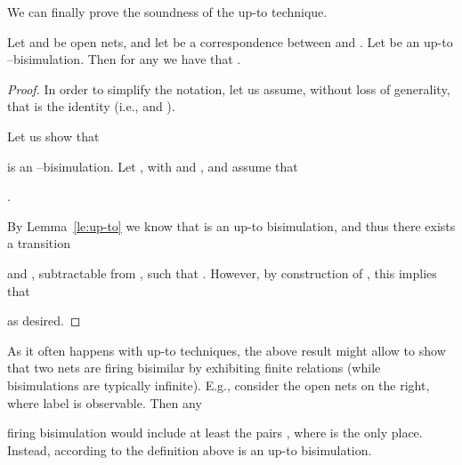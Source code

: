 \documentclass{LMCS}
\begin{document}
We can finally prove the soundness of the up-to technique.

\begin{prop}
  \label{pr:upto}
  Let  and  be open nets, and let  be a correspondence between  and .
  Let  be an up-to --bisimulation. Then for any
   we have that .
\end{prop}

\begin{proof}
  In order to simplify the notation, let us assume, without loss of
  generality, that  is the identity (i.e., 
  and ).

  Let us show that
  \begin{center}
    
  \end{center}
  is an --bisimulation. Let , with  and ,
  and assume that
  \begin{center}
    .
  \end{center}

  
  By Lemma~\ref{le:up-to} we know that  is an up-to
  bisimulation, and thus there exists a transition
  \begin{center}
    
  \end{center}
  and , subtractable from , such that . However, by
  construction of , this implies that
   \begin{center}
     
  \end{center}
  as desired.
\end{proof}



As it often happens with up-to techniques, the above result
might allow to show that two nets are firing bisimilar by exhibiting finite
relations (while bisimulations are typically infinite). E.g., consider
the open nets on the right, where label  is observable. Then any\linebreak
\begin{minipage}[c]{0.60\linewidth}
firing bisimulation would include at least
the pairs \linebreak , where  is the only place. Instead,
according to the definition above  is an up-to
bisimulation.
\end{minipage}
\begin{minipage}[c]{0.4\linewidth}
  \vspace{1mm}
\begin{center}
\end{center}
\end{minipage}
\end{document}
